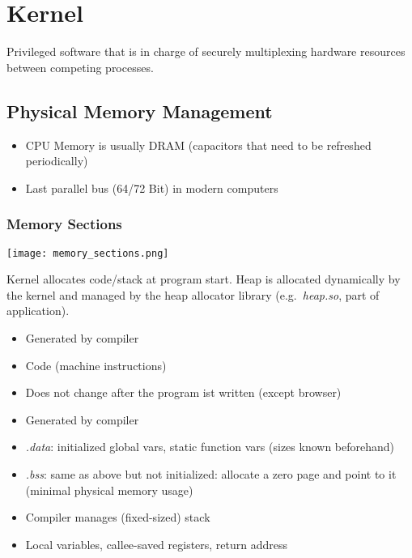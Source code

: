\section{Kernel}
Privileged software that is in charge of securely multiplexing hardware resources between competing processes.

\subsection{Physical Memory Management}
\begin{itemize}
    \item CPU Memory is usually DRAM (capacitors that need to be refreshed periodically)
    \item Last parallel bus (64/72 Bit) in modern computers
\end{itemize}


\subsubsection{Memory Sections}
\texttt{[image: memory\_sections.png]}

Kernel allocates code/stack at program start. Heap is allocated dynamically by the kernel and managed by the heap allocator library (e.g.\ \textit{heap.so}, part of application).


\begin{itemize}
    \item Generated by compiler
    \item Code (machine instructions)
    \item Does not change after the program ist written (except browser)
\end{itemize}



\begin{itemize}
    \item Generated by compiler
    \item \textit{.data}: initialized global vars, static function vars (sizes known beforehand)
    \item \textit{.bss}: same as above but not initialized: allocate a zero page and point to it (minimal physical memory usage)
\end{itemize}


\begin{itemize}
    \item Compiler manages (fixed-sized) stack
    \item Local variables, callee-saved registers, return address
\end{itemize}

